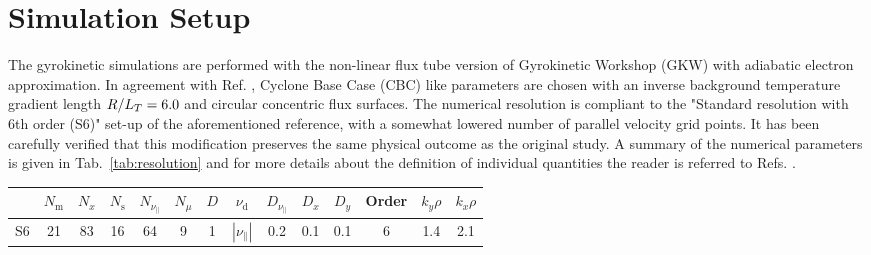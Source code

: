 \section{Simulation Setup}
\label{sec:simulation}

The gyrokinetic simulations are performed with the non-linear flux tube version of Gyrokinetic Workshop (GKW) \cite{peeters2009} with adiabatic electron approximation.
In agreement with Ref. , Cyclone Base Case (CBC) like parameters are chosen with an inverse background temperature gradient length $R/L_T = 6.0$ and circular concentric flux surfaces. 
The numerical resolution is compliant to the "Standard resolution with 6th order (S6)" set-up of the aforementioned reference, with a somewhat lowered number of parallel velocity grid points.
It has been carefully verified that this modification preserves the same physical outcome as the original study.
A summary of the numerical parameters is given in Tab.~\ref{tab:resolution} and for more details about the definition of individual quantities the reader is referred to Refs. .
\begin{center}
	\captionsetup{type=table}
	\begin{tabular}{l | ccccc | ccccc | c | cc}
		& $N_\mathrm{m}$ & $N_x$ & $N_\mathrm{s}$ & $N_{\nu_\parallel}$ & $N_\mu$ & $D$ & $\nu_\mathrm{d}$           & $D_{\nu_\parallel}$ & $D_x$ & $D_y$ & Order & $k_y\rho$ & $k_x\rho$ \\
		\hline
		S6   & 21    & 83    & 16    & 64                  & 9       & 1   & $|\nu_\parallel|$ & 0.2                 & 0.1   & 0.1   & 6     & 1.4       & 2.1       \\
	\end{tabular}
	\label{tab:resolutionBenchmark}
\end{center}